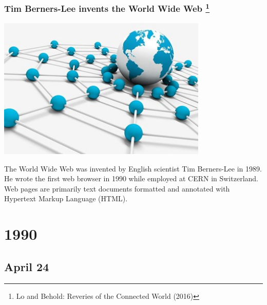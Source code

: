 \documentclass[11pt]{report}
\begin{document}
\subsection{Tim Berners-Lee invents the World Wide Web \protect\footnote{Lo and Behold: Reveries of the Connected World (2016)}}
\vspace{2mm}\begin{center}\includegraphics[width=10cm]{./img/www.jpg}\end{center}
The World Wide Web was invented by English scientist Tim Berners-Lee in 1989. He wrote the first web browser in 1990 while employed at CERN in Switzerland. Web pages are primarily text documents formatted and annotated with Hypertext Markup Language (HTML).

\chapter{1990}
\section{April 24}
\end{document}
